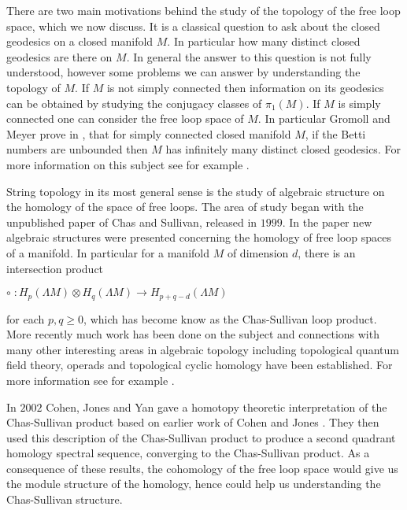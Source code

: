 \documentclass{article}
\theoremstyle{plain}
\theoremstyle{definition}
\numberwithin{thm}{section}
\begin{document}
			There are two main motivations behind the study of the topology of the free loop space, which we now discuss.
			It is a classical question to ask about the closed geodesics on a closed manifold $M$.
			In particular how many distinct closed geodesics are there on $M$. 
			In general the answer to this question is not fully understood,
			however some problems we can answer by understanding the topology of $M$.
			If $M$ is not simply connected then information on its geodesics can be obtained by studying the conjugacy classes of $\pi_1(M)$.
			If $M$ is simply connected one can consider the free loop space of $M$.
			In particular Gromoll and Meyer prove in \cite{PeriodicGeodesics}, that
			for simply connected closed manifold $M$, if the Betti numbers are unbounded then $M$ has infinitely many distinct closed geodesics. 
			For more information on this subject see for example \cite{ClosedGeodesicServay}.
			
			String topology in its most general sense is the study of algebraic structure on the homology of the space of free loops.
			The area of study began with the unpublished paper \cite{StringTopology} of Chas and Sullivan, released in $1999$.
			In the paper new algebraic structures were presented concerning the homology of free loop spaces of a manifold.
			In particular for a manifold $M$ of dimension $d$, there is an intersection product
			\begin{center}
			$\circ \; \colon H_p(\Lambda M) \otimes H_q(\Lambda M) \to H_{p+q-d}(\Lambda M)$
			\end{center}
			for each $p,q\geq 0$, which has become know as the Chas-Sullivan loop product.
			More recently much work has been done on the subject and connections with many other interesting areas in algebraic topology including
			topological quantum field theory, operads and topological cyclic homology have been established.
			For more information see for example \cite{MR2251006}.

			In $2002$ Cohen, Jones and Yan \cite{loop_homology_spectral_sequence} gave a homotopy theoretic interpretation
			of the Chas-Sullivan product based on earlier work of Cohen and Jones \cite{MR1942249}.
			They then used this description of the Chas-Sullivan product to produce a second quadrant homology spectral sequence, converging
			to the Chas-Sullivan product.
			As a consequence of these results,
			the cohomology of the free loop space would give us the module structure of the homology,
			hence could help us understanding the Chas-Sullivan structure.
		
\end{document}
